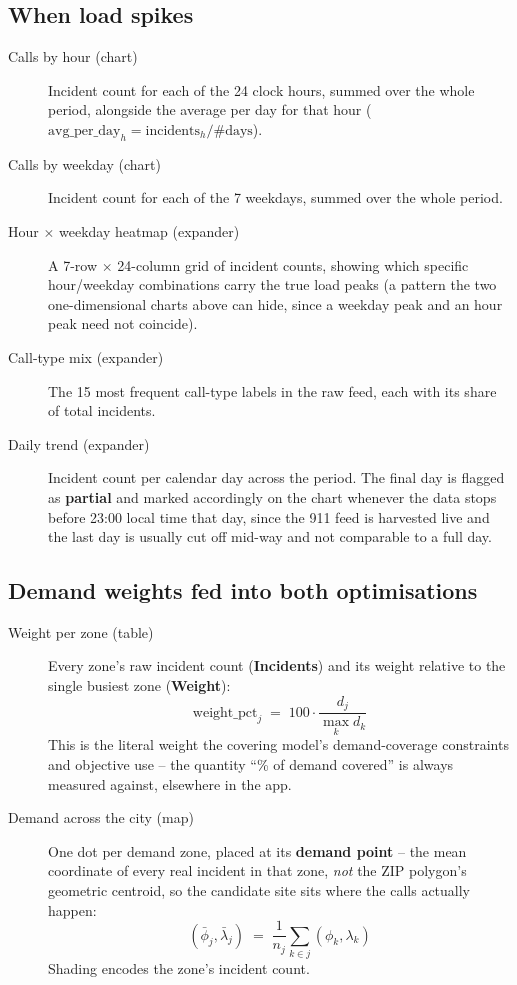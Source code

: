\documentclass[11pt]{article}
\begin{document}
\subsection{When load spikes}
\begin{description}
  \item[Calls by hour (chart)] Incident count for each of the 24 clock hours,
    summed over the whole period, alongside the average per day for that hour
    ($\text{avg\_per\_day}_h = \text{incidents}_h / \#\text{days}$).
  \item[Calls by weekday (chart)] Incident count for each of the 7 weekdays,
    summed over the whole period.
  \item[Hour $\times$ weekday heatmap (expander)] A 7-row $\times$ 24-column
    grid of incident counts, showing which specific hour/weekday combinations
    carry the true load peaks (a pattern the two one-dimensional charts above
    can hide, since a weekday peak and an hour peak need not coincide).
  \item[Call-type mix (expander)] The 15 most frequent call-type labels in the
    raw feed, each with its share of total incidents.
  \item[Daily trend (expander)] Incident count per calendar day across the
    period. The final day is flagged as \textbf{partial} and marked
    accordingly on the chart whenever the data stops before 23:00 local time
    that day, since the 911 feed is harvested live and the last day is usually
    cut off mid-way and not comparable to a full day.
\end{description}

\subsection{Demand weights fed into both optimisations}
\begin{description}
  \item[Weight per zone (table)] Every zone's raw incident count
    (\textbf{Incidents}) and its weight relative to the single busiest zone
    (\textbf{Weight}):
    \[
      \text{weight\_pct}_j \;=\; 100\cdot\frac{d_j}{\max_k d_k}
    \]
    This is the literal weight the covering model's demand-coverage
    constraints and objective use -- the quantity ``\% of demand covered''
    is always measured against, elsewhere in the app.
  \item[Demand across the city (map)] One dot per demand zone, placed at its
    \textbf{demand point} -- the mean coordinate of every real incident in
    that zone, \emph{not} the ZIP polygon's geometric centroid, so the
    candidate site sits where the calls actually happen:
    \[
      (\bar\phi_j,\bar\lambda_j) \;=\; \frac{1}{n_j}\sum_{k\in j}(\phi_k,\lambda_k)
    \]
    Shading encodes the zone's incident count.
\end{description}
\end{document}
